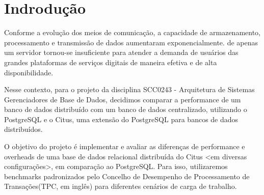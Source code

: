 \section{Indrodução}

Conforme a evolução dos meios de comunicação, a capacidade de armazenamento, processamento e transmissão de dados aumentaram exponencialmente. 
de apenas um servidor tornou-se insuficiente para atender a demanda de usuários das grandes plataformas 
de serviços digitais de maneira efetiva e de alta disponibilidade.

Nesse contexto, para o projeto da disciplina SCC0243 - Arquitetura de Sistemas Gerenciadores de Base de Dados,
decidimos comparar a performance de um banco de dados distribuído com um banco de dados centralizado,
utilizando o PostgreSQL e o Citus, uma extensão do PostgreSQL para bancos de dados distribuídos.

O objetivo do projeto é implementar e avaliar as diferenças de performance e overheads de uma base de dados
relacional distribuída do Citus <em diversas configurações>, em comparação ao PostgreSQL. 
Para isso, utilizaremos benchmarks padronizados pelo Concelho de Desempenho de Processamento de Transações(TPC, em inglês) 
para diferentes cenários de carga de trabalho.
